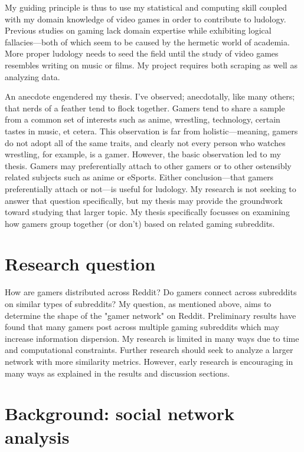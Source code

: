 \documentclass[12pt, a4paper]{article}
\begin{document}
My guiding principle is thus to use my statistical and computing skill coupled with my domain knowledge of video games in order to contribute to ludology. Previous studies on gaming lack domain expertise while exhibiting logical fallacies---both of which seem to be caused by the hermetic world of academia. More proper ludology needs to seed the field until the study of video games resembles writing on music or films. My project requires both scraping as well as analyzing data.

An anecdote engendered my thesis. I've observed; anecdotally, like many others; that nerds of a feather tend to flock together. Gamers tend to share a sample from a common set of interests such as anime, wrestling, technology, certain tastes in music, et cetera. This observation is far from holistic---meaning, gamers do not adopt all of the same traits, and clearly not every person who watches wrestling, for example, is a gamer. However, the basic observation led to my thesis. Gamers may preferentially attach to other gamers or to other ostensibly related subjects such as anime or eSports. Either conclusion---that gamers preferentially attach or not---is useful for ludology. My research is not seeking to answer that question specifically, but my thesis may provide the groundwork toward studying that larger topic. My thesis specifically focusses on examining how gamers group together (or don't) based on related gaming subreddits.

\section{Research question}
How are gamers distributed across Reddit? Do gamers connect across subreddits on similar types of subreddits? My question, as mentioned above, aims to determine the shape of the "gamer network" on Reddit. Preliminary results have found that many gamers post across multiple gaming subreddits which may increase information dispersion. My research is limited in many ways due to time and computational constraints. Further research should seek to analyze a larger network with more similarity metrics. However, early research is encouraging in many ways as explained in the results and discussion sections.

\section{Background: social network analysis}
\end{document}
